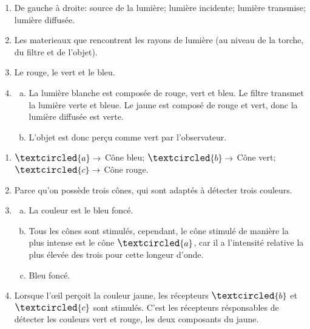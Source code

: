 \documentclass[12pt, a4paper]{article}
\begin{document}
    \begin{Exercise}[number={24}]
        \begin{enumerate}[1.]
            \item	De gauche à droite: source de la lumière; lumière incidente; lumière transmise; lumière diffusée.
            \item   Les materieaux que rencontrent les rayons de lumière (au niveau de la torche, du filtre et de l'objet).
            \item   Le rouge, le vert et le bleu.
            \item   \begin{enumerate}[a.]
                        \item   La lumière blanche est composée de rouge, vert et bleu. Le filtre transmet la lumière verte et bleue. Le jaune est composé de rouge et vert, donc la lumière diffusée est verte.
                        \item   L'objet est donc perçu comme vert par l'observateur.
                    \end{enumerate}
        \end{enumerate}
    \end{Exercise}

    \begin{Exercise}[number={27}]
        \begin{enumerate}[1.]
            \item	$\large\textcircled{\small{a}}\rightarrow$ Cône bleu; $\large\textcircled{\small{b}}\rightarrow$ Cône vert; $\large\textcircled{\small{c}}\rightarrow$ Cône rouge.
            \item   Parce qu'on possède trois cônes, qui sont adaptés à détecter trois couleurs.
            \item   \begin{enumerate}[a.]
                        \item	La couleur est le bleu foncé.
                        \item   Tous les cônes sont stimulés, cependant, le cône stimulé de manière la plus intense est le cône $\large\textcircled{\small{a}}$, car il a l'intensité relative la plus élevée des trois pour cette longeur d'onde.
                        \item   Bleu foncé.
                    \end{enumerate}
            \item   Lorsque l'œil perçoit la couleur jaune, les récepteurs $\large\textcircled{\small{b}}$ et $\large\textcircled{\small{c}}$ sont stimulés. C'est les récepteurs résponsables de détecter les couleurs vert et rouge, les deux composants du jaune.
        \end{enumerate}
    \end{Exercise}
\end{document}
